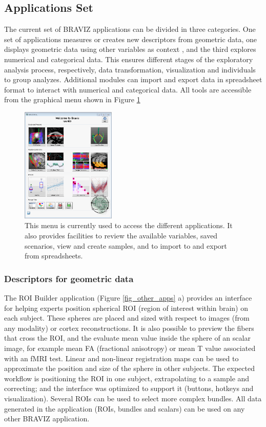 \documentclass[twocolumn]{svjour3}
\begin{document}
\subsection{Applications Set}


The current set of BRAVIZ applications can be divided in three categories. One set of applications measures or creates new descriptors from geometric data, one displays geometric data using other variables as context , and the third explores numerical and categorical data. This ensures different stages of the exploratory analysis process, respectively, data transformation, visualization and individuals to group analyzes. Additional modules can import and export data in spreadsheet format to interact with numerical and categorical data. All tools  are accessible from the graphical menu shown in Figure \ref{fig_menu}

\begin{figure}
\begin{center}
\includegraphics[width=0.4\textwidth]{figures/braviz_menu.PNG}
\end{center}
 \caption{\label{fig_menu}This menu is currently used to access the different applications. It also provides facilities to review the available variables, saved scenarios, view and create samples, and to import to and export from spreadsheets.  }
\end{figure}


\subsubsection{Descriptors for geometric data}

The ROI Builder application (Figure \ref{fig_other_apps} a) provides an interface for helping experts position spherical ROI  (region of interest within brain) on each subject. These spheres are placed and sized with respect to images (from any modality) or cortex reconstructions. It is also possible to preview the fibers that cross the ROI, and the evaluate mean value inside the sphere of an scalar image, for example mean FA (fractional anisotropy) or mean T value associated with an fMRI test. 
Linear and non-linear registration maps can be used to approximate the position and size of the sphere in other subjects. The expected workflow is positioning the ROI in one subject, extrapolating to a sample and correcting; and the interface was optimized to support it (buttons, hotkeys and visualization). Several ROIs can be used to select more complex bundles. All data generated in the application (ROIs, bundles and scalars) can be used on any other BRAVIZ application. 
\end{document}
